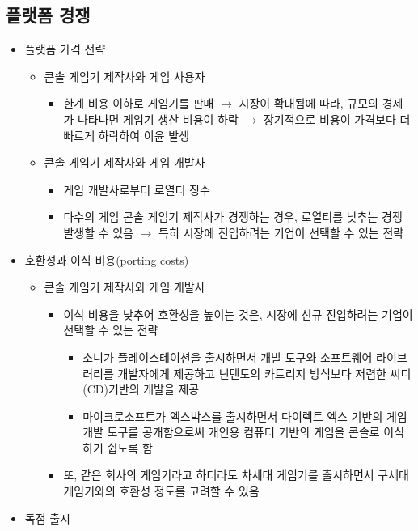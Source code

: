 \subsection{플랫폼 경쟁}
\begin{itemize}
\item 플랫폼 가격 전략
	\begin{itemize}
	\item 콘솔 게임기 제작사와 게임 사용자
		\begin{itemize}
		\item 한계 비용 이하로 게임기를 판매 $\rightarrow$ 시장이 확대됨에 따라, 규모의 경제가 나타나면 게임기 생산 비용이 하락 $\rightarrow$ 장기적으로 비용이 가격보다 더 빠르게 하락하여 이윤 발생
		\end{itemize}
	\item 콘솔 게임기 제작사와 게임 개발사
		\begin{itemize}
		\item 게임 개발사로부터 로열티 징수
		\item 다수의 게임 콘솔 게임기 제작사가 경쟁하는 경우, 로열티를 낮추는 경쟁 발생할 수 있음 $\rightarrow$ 특히 시장에 진입하려는 기업이 선택할 수 있는 전략 %
		\end{itemize}
	\end{itemize}
\item 호환성과 이식 비용(porting costs)
	\begin{itemize}
	\item 콘솔 게임기 제작사와 게임 개발사
		\begin{itemize}
		\item 이식 비용을 낮추어 호환성을 높이는 것은, 시장에 신규 진입하려는 기업이 선택할 수 있는 전략
			\begin{itemize}
			\item 소니가 플레이스테이션을 출시하면서 개발 도구와 소프트웨어 라이브러리를 개발자에게 제공하고 닌텐도의 카트리지 방식보다 저렴한 씨디(CD)기반의 개발을 제공
			\item 마이크로소프트가 엑스박스를 출시하면서 다이렉트 엑스 기반의 게임 개발 도구를 공개함으로써 개인용 컴퓨터 기반의 게임을 콘솔로 이식하기 쉽도록 함
			\end{itemize}
		\item 또, 같은 회사의 게임기라고 하더라도 차세대 게임기를 출시하면서 구세대 게임기와의 호환성 정도를 고려할 수 있음
		\end{itemize}
	\end{itemize}
\item 독점 출시
	\begin{itemize}

\end{itemize}
\end{itemize}
